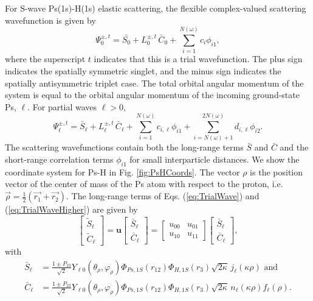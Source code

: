 \documentclass[reprint,showpacs,preprintnumbers,amsmath,amssymb,pra,aps]{revtex4-1}
\begin{document}
For S-wave Ps(1s)-H(1s) elastic scattering, the flexible complex-valued scattering wavefunction is given by
\begin{equation}
\Psi_0^{\pm,t} = \bar{S_0} + L_0^{\pm,t} \, \bar{C}_0 + \sum_{i=1}^{N(\omega)} c_i \phi_{i1},
\label{eq:TrialWave}
\end{equation}
where the superscript $t$ indicates that this is a trial wavefunction. The plus sign indicates the spatially symmetric singlet, and the minus sign indicates the spatially antisymmetric triplet case. The total orbital angular momentum of the system is equal to the orbital angular momentum of the incoming ground-state Ps, $\ell$. For partial waves $\ell > 0$,
\begin{equation}
\Psi_\ell^{\pm,t} = \bar{S}_\ell + L^{\pm,t}_\ell \, \bar{C}_\ell + \sum_{i=1}^{N(\omega)} c_{i,\ell} \phi_{i1} + \!\!\!\sum_{i=N(\omega)+1}^{2N(\omega)} \!\! d_{i,\ell} \phi_{i2}.
\label{eq:TrialWaveHigher}
\end{equation}
The scattering wavefunctions contain both the long-range terms $\bar{S}$ and $\bar{C}$ and the short-range correlation terms $\phi_{i1}$ for small interparticle distances. We show the coordinate system for Ps-H in Fig. \ref{fig:PsHCoords}. The vector $\rho$ is the position vector of the center of mass of the Ps atom with respect to the proton, i.e. $\vec{\rho} = \frac{1}{2}\left(\vec{r_1} + \vec{r_2}\right)$. The long-range terms of Eqs. (\ref{eq:TrialWave}) and (\ref{eq:TrialWaveHigher}) are given by
\begin{equation}
\label{eq:SCPhiDef}
\begin{bmatrix}
\widetilde{S}_\ell \\ \widetilde{C}_\ell
\end{bmatrix} = \textbf{u}  \begin{bmatrix}
\bar{S}_\ell \\ \bar{C}_\ell
\end{bmatrix} = \begin{bmatrix}
u_{00} & u_{01} \\  u_{10} & u_{11}
\end{bmatrix}
\begin{bmatrix}
\bar{S}_\ell \\ \bar{C}_\ell
\end{bmatrix}, 
\end{equation}
with
\begin{subequations}
\label{eq:SCBarPhiDef}
\begin{align}
\bar{S}_\ell &= \frac{1\pm P_{23}}{\sqrt{2}}Y_{\ell 0}(\theta_\rho,\varphi_\rho)\Phi_{Ps,1S}\left(r_{12}\right) \Phi_{H,1S}\left(r_3\right) \sqrt{2\kappa} \,j_\ell\left(\kappa\rho\right) \text{ and} \label{eq:SBar} \\
\bar{C}_\ell &= \frac{1\pm P_{23}}{\sqrt{2}}Y_{\ell 0}(\theta_\rho,\varphi_\rho)\Phi_{Ps,1S}\left(r_{12}\right) \Phi_{H,1S}\left(r_3\right) \sqrt{2\kappa} \,n_\ell\left(\kappa\rho\right) f_\ell(\rho). \label{eq:CBar}
\end{align}
\end{subequations}
\end{document}

